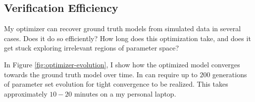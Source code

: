 \subsection{Verification Efficiency}
My optimizer can recover ground truth models from simulated data in several cases.
Does it do so efficiently?
How long does this optimization take, and does it get stuck exploring irrelevant regions of parameter space?

In Figure \ref{fig:optimizer-evolution}, I show how the optimized model converges towards the ground truth model over time.
In can require up to $200$ generations of parameter set evolution for tight convergence to be realized.
This takes approximately $10-20$ minutes on a my personal laptop.



